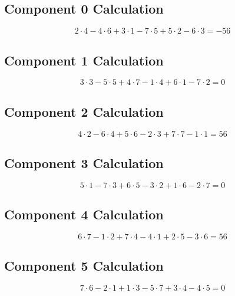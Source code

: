 \documentclass{article}
\begin{document}
\subsection*{ \vspace{1em} Component 0 Calculation}
\[
2 \cdot 4 - 4 \cdot 6 + 3 \cdot 1 - 7 \cdot 5 + 5 \cdot 2 - 6 \cdot 3 = -56
\]
\subsection*{ \vspace{1em} Component 1 Calculation}
\[
3 \cdot 3 - 5 \cdot 5 + 4 \cdot 7 - 1 \cdot 4 + 6 \cdot 1 - 7 \cdot 2 = 0
\]
\subsection*{ \vspace{1em} Component 2 Calculation}
\[
4 \cdot 2 - 6 \cdot 4 + 5 \cdot 6 - 2 \cdot 3 + 7 \cdot 7 - 1 \cdot 1 = 56
\]
\subsection*{ \vspace{1em} Component 3 Calculation}
\[
5 \cdot 1 - 7 \cdot 3 + 6 \cdot 5 - 3 \cdot 2 + 1 \cdot 6 - 2 \cdot 7 = 0
\]
\subsection*{ \vspace{1em} Component 4 Calculation}
\[
6 \cdot 7 - 1 \cdot 2 + 7 \cdot 4 - 4 \cdot 1 + 2 \cdot 5 - 3 \cdot 6 = 56
\]
\subsection*{ \vspace{1em} Component 5 Calculation}
\[
7 \cdot 6 - 2 \cdot 1 + 1 \cdot 3 - 5 \cdot 7 + 3 \cdot 4 - 4 \cdot 5 = 0
\]
\end{document}
